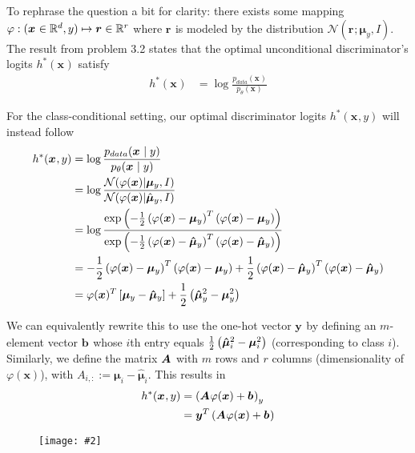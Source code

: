\documentclass[11pt]{article}
\renewcommand\vec[2][]{\bm{#2}_{#1}}
\newcommand\myfig[2][0.3\textwidth]{\begin{figure}[h!]\centering\texttt{[image: \#2]}\end{figure}}
\newcommand{\bx}{{\boldsymbol{x}}}
\newcommand{\bmu}{{\boldsymbol{\mu}}}
\begin{document}
To rephrase the question a bit for clarity: there exists some mapping $\varphi : (\vec x \in \R ^d, y) \mapsto \vec r \in \R^{r}$ where $\vec r$ is modeled by the distribution $\mathcal{N}(\vec r; \vec[y]{\mu}, I)$. The result from problem 3.2 states that the optimal unconditional discriminator's logits $h^*(\vec x)$ satisfy
\begin{align}
	h^*(\vec x)
		&= \log \frac{p_{data}(\vec x)}{p_{\theta}(\vec x)}
\end{align}

For the class-conditional setting, our optimal discriminator logits $h^*(\vec x, y)$ will instead follow
\begin{align}
h^*(\vec x, y)
	&= \log \frac{p_{data}(\vec x \mid y)}{p_{\theta}(\vec x \mid y)} \\
	&= \log \frac{\mathcal{N}(\varphi(\bx) | \bmu_y, I)}{\mathcal{N}(\varphi(\bx) | \hat\bmu_y, I)} \\
	&= \log \frac{   \exp\lr{ - \onehalf \lr{ \varphi(\bx) - \vec[y]{\mu}  }^T \lr{ \varphi(\bx)- \vec[y]{\mu}  }  }      }{  
		\exp\lr{ - \onehalf \lr{ \varphi(\bx) - \vec[y]{\hat \mu}  }^T \lr{ \varphi(\bx)- \vec[y]{\hat \mu}  }  }  	
     } \\
 	&=  - \onehalf \lr{ \varphi(\bx)- \vec[y]{\mu}  }^T \lr{ \varphi(\bx) - \vec[y]{\mu}  }   + \onehalf \lr{ \varphi(\bx) - \vec[y]{\hat \mu}  }^T \lr{ \varphi(\bx)- \vec[y]{\hat \mu}  } \\
 	&=\varphi(\bx)^T \left[ \vec[y]{\mu} - \vec[y]{\hat \mu}  \right] + \onehalf \lr{  \vec[y]{\hat \mu}^2 - \vec[y]{\mu}^2   }
\end{align}

We can equivalently rewrite this to use the one-hot vector $\vec y$ by defining an $m$-element vector $\vec b$ whose $i$th entry equals $ \onehalf \lr{  \vec[i]{\hat \mu}^2 - \vec[i]{\mu}^2   }$ (corresponding to class $i$). Similarly, we define the matrix $\bm{A}_{}$ with $m$ rows and $r$ columns (dimensionality of $\varphi(\bx)$), with $A_{i,:} := \vec[i]{\mu} - \vec[i]{\hat\mu}$. This results in
\begin{align}
	h^*(\vec x, y)
		&= \lr{  \matr A \varphi(\bx) + \vec b}_{y} \\
		&= \vec{y}^T \lr{  \matr A \varphi(\bx) + \vec b}
\end{align}



\clearpage

\myfig[\textwidth]{figs/4_2.png}
\end{document}
